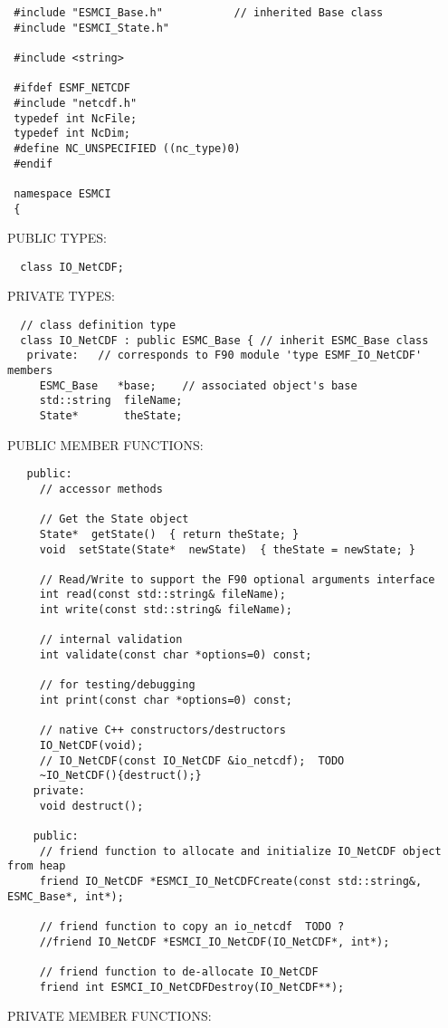 \begin{verbatim} #include "ESMCI_Base.h"           // inherited Base class
 #include "ESMCI_State.h"
 
 #include <string>
 
 #ifdef ESMF_NETCDF
 #include "netcdf.h"
 typedef int NcFile;
 typedef int NcDim;
 #define NC_UNSPECIFIED ((nc_type)0)
 #endif
 
 namespace ESMCI
 {
 \end{verbatim}{\sf PUBLIC TYPES:}
\begin{verbatim}  class IO_NetCDF;
 \end{verbatim}{\sf PRIVATE TYPES:}
\begin{verbatim} 
  // class definition type
  class IO_NetCDF : public ESMC_Base { // inherit ESMC_Base class
   private:   // corresponds to F90 module 'type ESMF_IO_NetCDF' members
     ESMC_Base   *base;    // associated object's base
     std::string  fileName;
     State*       theState;
 \end{verbatim}{\sf PUBLIC MEMBER FUNCTIONS:}
\begin{verbatim} 
   public:
     // accessor methods
 
     // Get the State object
     State*  getState()  { return theState; }
     void  setState(State*  newState)  { theState = newState; }
 
     // Read/Write to support the F90 optional arguments interface
     int read(const std::string& fileName);
     int write(const std::string& fileName);
 
     // internal validation
     int validate(const char *options=0) const;
 
     // for testing/debugging
     int print(const char *options=0) const;
 
     // native C++ constructors/destructors
     IO_NetCDF(void);
     // IO_NetCDF(const IO_NetCDF &io_netcdf);  TODO
     ~IO_NetCDF(){destruct();}
    private:
     void destruct();
    
    public:
     // friend function to allocate and initialize IO_NetCDF object from heap
     friend IO_NetCDF *ESMCI_IO_NetCDFCreate(const std::string&, ESMC_Base*, int*);
 
     // friend function to copy an io_netcdf  TODO ?
     //friend IO_NetCDF *ESMCI_IO_NetCDF(IO_NetCDF*, int*);
 
     // friend function to de-allocate IO_NetCDF
     friend int ESMCI_IO_NetCDFDestroy(IO_NetCDF**);
 \end{verbatim}{\sf PRIVATE MEMBER FUNCTIONS:}

